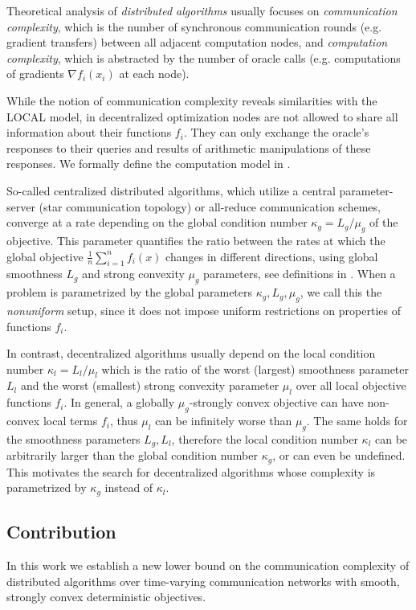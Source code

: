 \documentclass[a4paper,USenglish,cleveref, autoref, thm-restate]{lipics-v2021}
\begin{document}
Theoretical analysis of \textit{distributed algorithms} usually focuses on \textit{communication complexity}, which is the number of synchronous communication rounds (e.g. gradient transfers) between all adjacent computation nodes,
and \textit{computation complexity}, which is abstracted by the number of oracle calls (e.g. computations of gradients $\nabla f_i (x_i)$ at each node).

While the notion of communication complexity reveals similarities with the LOCAL model, in decentralized optimization nodes are not allowed to share all information about their functions $f_i$.
They can only exchange the oracle's responses to their queries and results of arithmetic manipulations of these responses.
We formally define the computation model in .



So-called centralized distributed algorithms, which utilize a central parameter-server (star communication topology) or all-reduce communication schemes, converge at a rate depending on the global condition number $\kappa_g = L_g /\mu_g$ of the objective.
This parameter quantifies the ratio between the rates at which
the global objective $\frac1n \sum_{i=1}^n f_i(x)$ changes in different directions, using global smoothness $L_g$ and strong convexity $\mu_g$ parameters, see  definitions in .
When a problem is parametrized by the global parameters $\kappa_g, L_g, \mu_g$, we call this the \textit{nonuniform} setup, since it does not impose uniform restrictions on properties of functions $f_i$.

In contrast, decentralized algorithms usually depend on the local condition number $\kappa_l = L_l /\mu_l$ which is the ratio of the worst (largest) smoothness parameter $L_l$ and the worst (smallest) strong convexity parameter $\mu_l$ over all local objective functions $f_i$. 
In general, a globally $\mu_g$-strongly convex objective can have non-convex local terms $f_i$, thus $\mu_l$ can be infinitely worse than $\mu_g$. 
The same holds for the smoothness parameters $L_g, L_l$, therefore the local condition number $\kappa_l$ can be arbitrarily larger than the global condition number $\kappa_g$, or can even be undefined.
This motivates the search for decentralized algorithms whose complexity is parametrized by $\kappa_g$ instead of $\kappa_l$.


\subsection{Contribution}
In this work we establish a new lower bound on the communication complexity of distributed algorithms over time-varying communication networks with smooth, strongly convex deterministic objectives.
\end{document}
